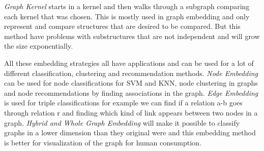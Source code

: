 \textit{Graph Kernel} starts in a kernel and then walks through a subgraph comparing each kernel that was chosen. This is mostly used in graph embedding and only represent and compare structures that are desired to be compared. But this method have problems with substructures that are not independent and will grow the size exponentially.

All these embedding strategies all have applications and can be used for a lot of different classification, clustering and recommendation methods. \textit{Node Embedding} can be used for node classifications for SVM and KNN, node clustering in graphs and node recommendations by finding associations in the graph. \textit{Edge Embedding} is used for triple classifications for example we can find if a relation a-b goes through relation r and finding which kind of link appears between two nodes in a graph. \textit{Hybrid and Whole Graph Embedding} will make it possible to classify graphs in a lower dimension than they original were and this embedding method is better for visualization of the graph for human consumption.
